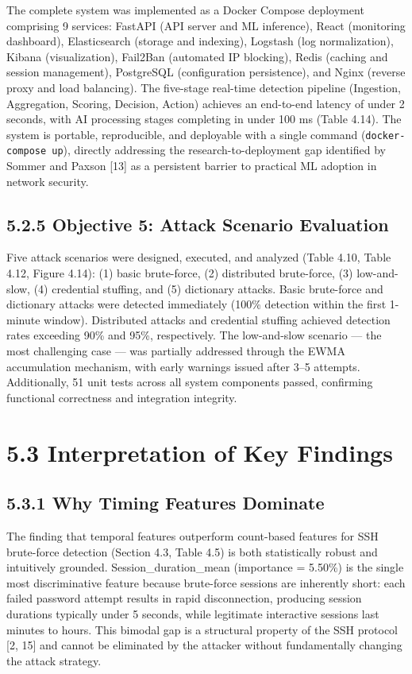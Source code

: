 \documentclass[
  a4paper]{report}
\begin{document}
The complete system was implemented as a Docker Compose deployment
comprising 9 services: FastAPI (API server and ML inference), React
(monitoring dashboard), Elasticsearch (storage and indexing), Logstash
(log normalization), Kibana (visualization), Fail2Ban (automated IP
blocking), Redis (caching and session management), PostgreSQL
(configuration persistence), and Nginx (reverse proxy and load
balancing). The five-stage real-time detection pipeline (Ingestion,
Aggregation, Scoring, Decision, Action) achieves an end-to-end latency
of under 2 seconds, with AI processing stages completing in under 100 ms
(Table 4.14). The system is portable, reproducible, and deployable with
a single command (\texttt{docker-compose\ up}), directly addressing the
research-to-deployment gap identified by Sommer and Paxson {[}13{]} as a
persistent barrier to practical ML adoption in network security.

\subsection{5.2.5 Objective 5: Attack Scenario
Evaluation}\label{objective-5-attack-scenario-evaluation}

Five attack scenarios were designed, executed, and analyzed (Table 4.10,
Table 4.12, Figure 4.14): (1) basic brute-force, (2) distributed
brute-force, (3) low-and-slow, (4) credential stuffing, and (5)
dictionary attacks. Basic brute-force and dictionary attacks were
detected immediately (100\% detection within the first 1-minute window).
Distributed attacks and credential stuffing achieved detection rates
exceeding 90\% and 95\%, respectively. The low-and-slow scenario --- the
most challenging case --- was partially addressed through the EWMA
accumulation mechanism, with early warnings issued after 3--5 attempts.
Additionally, 51 unit tests across all system components passed,
confirming functional correctness and integration integrity.

\section{5.3 Interpretation of Key
Findings}\label{interpretation-of-key-findings}

\subsection{5.3.1 Why Timing Features
Dominate}\label{why-timing-features-dominate}

The finding that temporal features outperform count-based features for
SSH brute-force detection (Section 4.3, Table 4.5) is both statistically
robust and intuitively grounded. Session\_duration\_mean (importance =
5.50\%) is the single most discriminative feature because brute-force
sessions are inherently short: each failed password attempt results in
rapid disconnection, producing session durations typically under 5
seconds, while legitimate interactive sessions last minutes to hours.
This bimodal gap is a structural property of the SSH protocol {[}2,
15{]} and cannot be eliminated by the attacker without fundamentally
changing the attack strategy.
\end{document}
